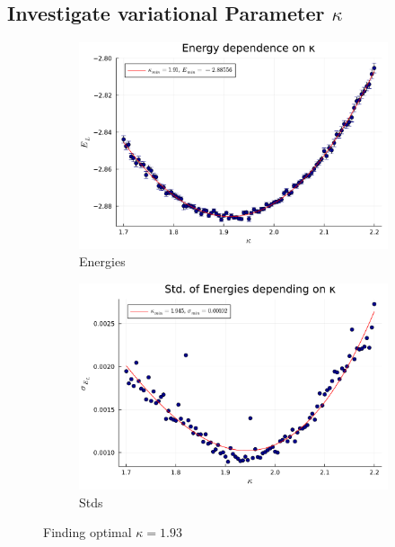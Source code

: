 \documentclass[
	a4paper, %
	10pt, %
]{CSUniSchoolLabReport}
\begin{document}
\subsection{Investigate variational Parameter $\kappa$}

\begin{figure}[H]
	\begin{subfigure}[b]{0.49\textwidth}
		\centering
		\includegraphics[width=\textwidth]{../saves/task1d.avEnergies.pdf}
		\caption{Energies}
	\end{subfigure}
	\hfill
	\begin{subfigure}[b]{0.49\textwidth}
		\centering
		\includegraphics[width=\textwidth]{../saves/task1d.avStd.pdf}
		\caption{Stds}
	\end{subfigure}
	\caption{Finding optimal $\kappa=1.93$}
	\label{fig:optkappa}
\end{figure}
\end{document}
